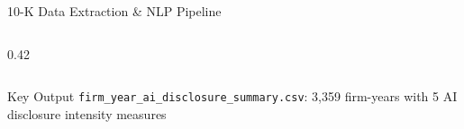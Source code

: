 \documentclass[aspectratio=169]{beamer}
\begin{document}
\begin{frame}{10-K Data Extraction \& NLP Pipeline}
\begin{columns}[T]
\begin{column}{0.42\textwidth}
\end{column}
\end{columns}

\vspace{0.3cm}
\begin{block}{Key Output}
\texttt{firm\_year\_ai\_disclosure\_summary.csv}: 3,359 firm-years with 5 AI disclosure intensity measures
\end{block}

\end{frame}

\end{document}
